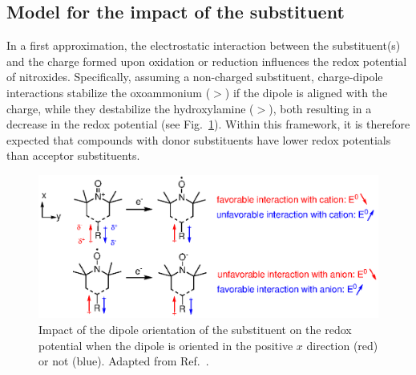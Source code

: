 \documentclass[review,preprint]{elsarticle}
\begin{document}
\subsection{Model for the impact of the substituent}\label{sec:eleczhang}

In a first approximation, the electrostatic interaction between the substituent(s) and the charge formed upon oxidation or reduction influences the redox potential of nitroxides. Specifically, assuming a non-charged substituent, charge-dipole interactions stabilize the oxoammonium ($>$) if the dipole is aligned with the charge, while they destabilize the hydroxylamine ($>$), both resulting in a decrease in the redox potential (see Fig.~\ref{fig:dipole}). Within this framework, it is therefore expected that compounds with donor substituents have lower redox potentials than acceptor substituents.


\begin{figure}[!h]
	\centering
	\includegraphics[width=\linewidth]{Figure4}
	\caption{Impact of the dipole orientation of the substituent on the redox potential when the dipole is oriented in  the positive $x$ direction (red) or not (blue). Adapted from Ref.~.}
	\label{fig:dipole}
\end{figure}
\end{document}
